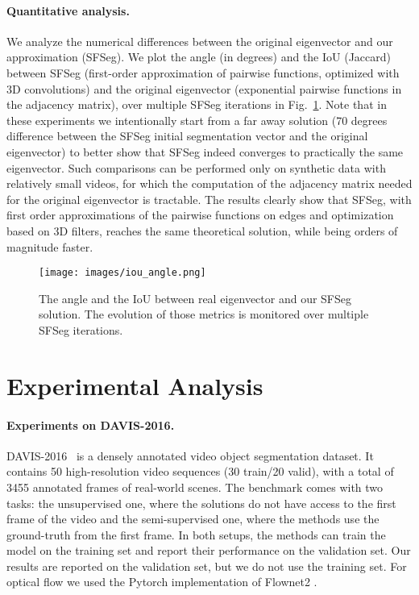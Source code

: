 \documentclass{article}
\begin{document}
\paragraph{Quantitative analysis.} We analyze the numerical differences between the original eigenvector and our approximation (SFSeg). We plot the angle (in degrees) and the IoU (Jaccard) between SFSeg (first-order approximation of pairwise functions, optimized with 3D convolutions) and the original eigenvector (exponential pairwise functions in the adjacency matrix), over multiple SFSeg iterations in Fig.~\ref{fig: approx}. Note that in these experiments we intentionally start from a far away solution (70 degrees difference between the SFSeg initial segmentation vector and the original eigenvector) to better show that SFSeg indeed converges to practically the same eigenvector.
Such comparisons can be performed only on synthetic data with relatively small videos, for which the computation of the adjacency matrix needed for the original eigenvector is tractable. The results clearly show that SFSeg, with first order approximations of the pairwise functions on edges and optimization based on 3D filters, reaches the same theoretical solution, while being orders of magnitude faster.

\begin{figure}[t]
\begin{center}
    \texttt{[image: images/iou\_angle.png]}
    \end{center}
	\caption{The angle and the IoU between real eigenvector and our SFSeg solution. The evolution of those metrics is monitored over multiple SFSeg iterations.}
	\label{fig: approx}
\end{figure}


\section{Experimental Analysis}
\label{sec: experiments}

\paragraph{Experiments on DAVIS-2016.} DAVIS-2016~\cite{davis2016} is a densely annotated video object segmentation dataset. It contains 50 high-resolution video sequences (30 train/20 valid), with a total of 3455 annotated frames of real-world scenes. The benchmark comes with two tasks: the unsupervised one, where the solutions do not have access to the first frame of the video and the semi-supervised one, where the methods use the ground-truth from the first frame. In both setups, the methods can train the model on the training set and report their performance on the validation set. Our results are reported on the validation set, but we do not use the training set. For optical flow we used the Pytorch implementation of Flownet2 \cite{flownet2-pytorch}.
\end{document}
